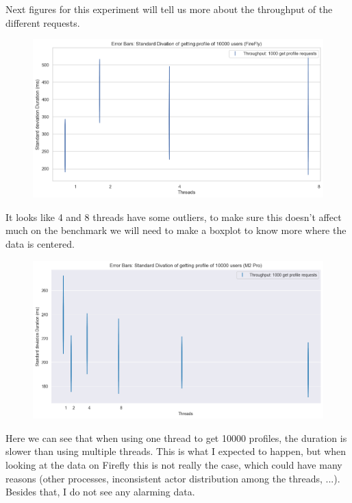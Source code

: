 \documentclass[a4paper]{article}
\begin{document}
Next figures for this experiment will tell us more about the throughput of the different requests. 
\begin{figure}[H]
	\centering
	\includegraphics[width = \linewidth]{Images/ThroughputStdFirefly.png}
	\caption{}
\end{figure}
It looks like 4 and 8 threads have some outliers, to make sure this doesn't affect much on the benchmark we will need to make a boxplot to know more where the data is centered.  

\begin{figure}[H]
	\centering
	\includegraphics[width = \linewidth]{Images/ThroughputStd.png}
	\caption{}
\end{figure}
Here we can see that when using one thread to get 10000 profiles, the duration is slower than using multiple threads. This is what I expected to happen, but when looking at the data on Firefly this is not really the case, which could have many reasons (other processes, inconsistent actor distribution among the threads, ...). Besides that, I do not see any alarming data.  
\end{document}

